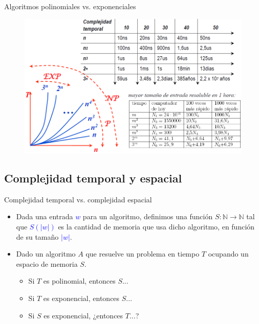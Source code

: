 \documentclass{beamer} %
\newcommand{\blue}[1]{\textcolor{blue}{#1}}
\begin{document}
\begin{frame}{Algoritmos polinomiales vs. exponenciales}
  \begin{figure}[h]
    \includegraphics[width=\textwidth]{./image/cap1/EXP.png}
  \end{figure}
\end{frame}

\subsection{Complejidad temporal y espacial}

\begin{frame}{Complejidad temporal vs. complejidad espacial}
  \begin{itemize}
    \item<1-> Dada una entrada \blue{$w$} para un algoritmo, definimos una función $S:\mathbb{N}\to\mathbb{N}$ tal que \blue{$S(|w|)$} es la cantidad de memoria que usa dicho algoritmo, en función de su tamaño \blue{$|w|$}.
    \item<2-> Dado un algoritmo $A$ que resuelve un problema en tiempo $T$ ocupando un espacio de memoria $S$.
      \begin{itemize}
        \item<3-> Si $T$ es polinomial, entonces $S$... 
        \item<5-> Si $T$ es exponencial, entonces $S$... 
        \item<7-> Si $S$ es exponencial, ¿entonces $T$...?
      \end{itemize}
    \end{itemize}
\end{frame}
\end{document}
